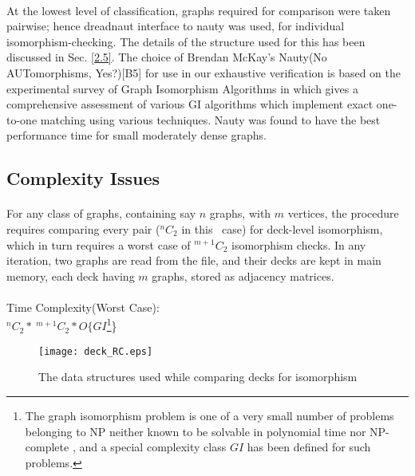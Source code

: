\documentclass[12pt,conference]{IEEEtran}
\begin{document}
\paragraph*{} At the lowest level of classification, graphs required for comparison were taken pairwise; hence dreadnaut interface to nauty \cite{b5} was used, for individual isomorphism-checking. The details of the structure used for this has been discussed in Sec. \ref{2.5}. The choice of Brendan McKay’s Nauty(No AUTomorphisms, Yes?)[B5] for use in our exhaustive verification is based on the experimental survey of Graph Isomorphism Algorithms in \cite{f1} which gives a comprehensive assessment of various GI algorithms which implement exact one-to-one matching using various techniques. Nauty was found to have the best performance time for small moderately dense graphs. 



\subsection{\label{2.2} Complexity Issues }
\paragraph*{} For any class of graphs, containing say $n$ graphs, with $m$ vertices, the procedure requires comparing every pair ($^nC_2$ in this  case) for deck-level isomorphism, which in turn requires a worst case of $^{m+1}C_2$ isomorphism checks. In any iteration, two graphs are read from the file, and their decks are kept in main memory, each deck having $m$ graphs, stored as adjacency matrices.
\paragraph*{}
Time Complexity(Worst Case): \\  
           \hspace*{2 cm} $  ^nC_2 *\ ^{m+1}C_2 * O \{ GI$\footnote { The graph isomorphism problem is one of a very small number of problems belonging to NP neither known to be solvable in polynomial time nor NP-complete \cite{g1}, and a special complexity class $GI$ has been defined for such problems.}\} 



\begin{figure*}
	  \centering 
           \texttt{[image: deck\_RC.eps]}
	   \caption{The data structures used while comparing decks for isomorphism}
	   \label{deck}
  \end{figure*} 
\end{document}
